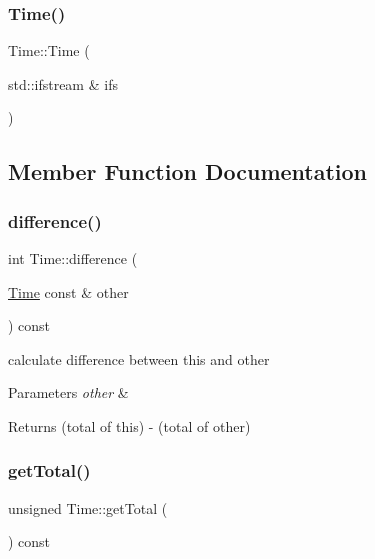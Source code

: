 \subsubsection{\texorpdfstring{Time()}{Time()}\hspace{0.1cm}{\footnotesize\ttfamily [3/3]}}
{\footnotesize\ttfamily Time\+::\+Time (\begin{DoxyParamCaption}\item[{std\+::ifstream \&}]{ifs }\end{DoxyParamCaption})}



\subsection{Member Function Documentation}
\mbox{\label{classTime_af02e08b3bf203d9cedbf9f629cddcc1f}} 
\subsubsection{\texorpdfstring{difference()}{difference()}}
{\footnotesize\ttfamily int Time\+::difference (\begin{DoxyParamCaption}\item[{\hyperlink{classTime}{Time} const \&}]{other }\end{DoxyParamCaption}) const}

calculate difference between this and other 
\begin{DoxyParams}{Parameters}
{\em other} & \\
\hline
\end{DoxyParams}
\begin{DoxyReturn}{Returns}
(total of this) -\/ (total of other) 
\end{DoxyReturn}
\mbox{\label{classTime_ac64625b85a2497986774edcc8dde50e9}} 
\subsubsection{\texorpdfstring{get\+Total()}{getTotal()}}
{\footnotesize\ttfamily unsigned Time\+::get\+Total (\begin{DoxyParamCaption}{ }\end{DoxyParamCaption}) const}

